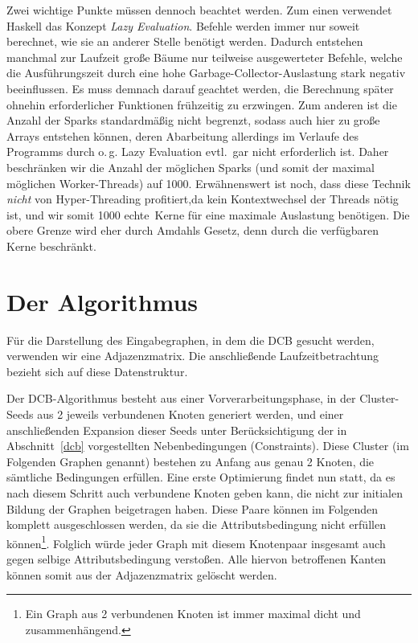 \documentclass[a4paper]{scrartcl}
\newcommand{\en}[1]{\selectlanguage{USenglish}#1\selectlanguage{ngerman}}
\begin{document}
\medskip
Zwei wichtige Punkte müssen dennoch beachtet werden. Zum einen verwendet Haskell das Konzept \emph{\en{Lazy Evaluation}}. Befehle werden immer nur soweit berechnet, wie sie an anderer Stelle benötigt werden. Dadurch entstehen manchmal zur Laufzeit große Bäume nur teilweise ausgewerteter Befehle, welche die Ausführungszeit durch eine hohe Garbage-Collector-Auslastung stark negativ beeinflussen. Es muss demnach darauf geachtet werden, die Berechnung später ohnehin erforderlicher Funktionen frühzeitig zu erzwingen. Zum anderen ist die Anzahl der Sparks standardmäßig nicht begrenzt, sodass auch hier zu große Arrays entstehen können, deren Abarbeitung allerdings im Verlaufe des Programms durch o.\,g. Lazy Evaluation evtl.\ gar nicht erforderlich ist. Daher beschränken wir die Anzahl der möglichen Sparks (und somit der maximal möglichen Worker-Threads) auf 1000. Erwähnenswert ist noch, dass diese Technik \emph{nicht} von Hyper-Threading profitiert,da kein Kontextwechsel der Threads nötig ist, und wir somit 1000 \glqq echte\grqq \ Kerne für eine maximale Auslastung benötigen. Die obere Grenze wird eher durch Amdahls Gesetz, denn durch die verfügbaren Kerne beschränkt.\par


\section{Der Algorithmus}

Für die Darstellung des Eingabegraphen, in dem die DCB gesucht werden, verwenden wir eine Adjazenzmatrix. Die anschließende Laufzeitbetrachtung bezieht sich auf diese Datenstruktur. \par
Der DCB-Algorithmus besteht aus einer Vorverarbeitungsphase, in der Cluster-Seeds aus 2 jeweils verbundenen Knoten generiert werden, und einer anschließenden Expansion dieser Seeds unter Berücksichtigung der in Abschnitt~\ref{dcb} vorgestellten Nebenbedingungen (Constraints). Diese Cluster (im Folgenden Graphen genannt) bestehen zu Anfang aus genau 2 Knoten, die sämtliche Bedingungen erfüllen. Eine erste Optimierung findet nun statt, da es nach diesem Schritt auch verbundene Knoten geben kann, die nicht zur initialen Bildung der Graphen beigetragen haben. Diese Paare können im Folgenden komplett ausgeschlossen werden, da sie die Attributsbedingung nicht erfüllen können\footnote{Ein Graph aus 2 verbundenen Knoten ist immer maximal dicht und zusammenhängend.}. Folglich würde jeder Graph mit diesem Knotenpaar insgesamt auch gegen selbige Attributsbedingung verstoßen. Alle hiervon betroffenen Kanten können somit aus der Adjazenzmatrix gelöscht werden.\par
\end{document}
